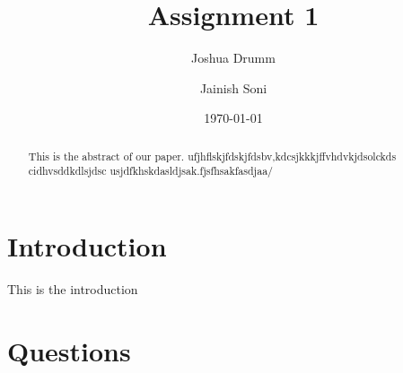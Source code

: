 \documentclass[sigplan,screen]{acmart}
\begin{document}
\title{Assignment 1}

\author{Joshua Drumm}

\author{Jainish Soni}

\date{\today}
\maketitle

\begin{abstract}
This is the abstract of our paper. ufjhflskjfdskjfdsbv,kdcsjkkkjffvhdvkjdsolckds cidhvsddkdlsjdsc
usjdfkhskdasldjsak.fjsfhsakfasdjaa/

\end{abstract}


\newpage
{}



\section{Introduction}
This is the introduction

\section{Questions}
\end{document}
